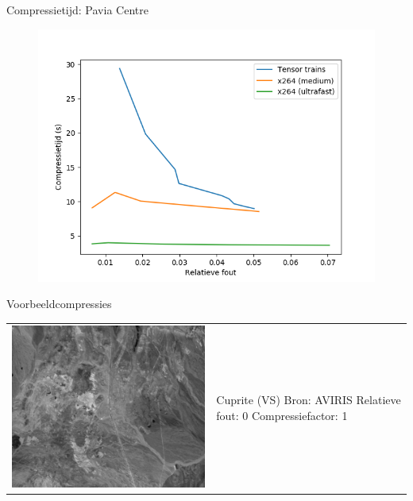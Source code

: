 \documentclass[t,12pt,dutch
\ifx\beamermode\undefined\else,\beamermode\fi
]{beamer}
\begin{document}
\begin{frame}{Compressietijd: Pavia Centre}

\begin{figure}[H]
\centering
\includegraphics[scale=0.5]{images/general_comparison_times_Pavia_Centre.png}
\end{figure}

\end{frame}

\begin{frame}{Voorbeeldcompressies}

\begin{table}[H]
\centering
\begin{tabular}{C{0.6\textwidth}  L{0.4\textwidth}}
\includegraphics[width=\linewidth]{images/cuprite_cropped_sum.png}
&
Cuprite (VS)\newline
Bron: AVIRIS \cite{ref:ehu_aviris_cuprite}\newline
\vspace{5mm}
Relatieve fout: 0
Compressiefactor: 1
\end{tabular}
\end{table}

\end{frame}
\end{document}

